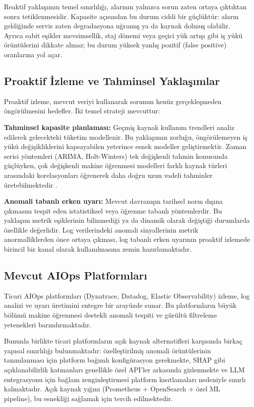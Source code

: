 Reaktif yaklaşımın temel sınırlılığı, alarmın yalnızca sorun zaten ortaya çıktıktan sonra tetiklenmesidir.
Kapasite açısından bu durum ciddi bir güçlüktür: alarm geldiğinde servis zaten degradasyona uğramış ya da kaynak dolmuş olabilir.
Ayrıca sabit eşikler mevsimsellik, staj dönemi veya geçici yük artışı gibi iş yükü örüntülerini dikkate almaz; bu durum yüksek yanlış pozitif (false positive) oranlarına yol açar.

\subsection{Proaktif İzleme ve Tahminsel Yaklaşımlar}

Proaktif izleme, mevcut veriyi kullanarak sorunun henüz gerçekleşmeden öngörülmesini hedefler.
İki temel strateji mevcuttur:

\textbf{Tahminsel kapasite planlaması:} Geçmiş kaynak kullanım trendleri analiz edilerek gelecekteki tüketim modellenir.
Bu yaklaşımın zorluğu, öngörülemeyen iş yükü değişikliklerini kapsayabilen yeterince esnek modeller geliştirmektir.
Zaman serisi yöntemleri (ARIMA, Holt-Winters) tek değişkenli tahmin konusunda güçlüyken, çok değişkenli makine öğrenmesi modelleri farklı kaynak türleri arasındaki korelasyonları öğrenerek daha doğru uzun vadeli tahminler üretebilmektedir \autocite{makedonas2022}.

\textbf{Anomali tabanlı erken uyarı:} Mevcut davranışın tarihsel norm dışına çıkmasını tespit eden istatistiksel veya öğrenme tabanlı yöntemlerdir.
Bu yaklaşım metrik eşiklerinin bilinmediği ya da dinamik olarak değiştiği durumlarda özellikle değerlidir.
Log verilerindeki anomali sinyallerinin metrik anormalliklerden önce ortaya çıkması, log tabanlı erken uyarının proaktif izlemede birincil bir kanal olarak kullanılmasına zemin hazırlamaktadır.

\subsection{Mevcut AIOps Platformları}

Ticari AIOps platformları (Dynatrace, Datadog, Elastic Observability) izleme, log analizi ve uyarı üretimini entegre bir arayüzde sunar.
Bu platformların büyük bölümü makine öğrenmesi destekli anomali tespiti ve gürültü filtreleme yetenekleri barındırmaktadır.

Bununla birlikte ticari platformların açık kaynak alternatifleri karşısında birkaç yapısal sınırlılığı bulunmaktadır: özelleştirilmiş anomali örüntülerinin tanımlanması için platform bağımlı konfigürasyon gerekmekte, SHAP gibi açıklanabilirlik katmanları genellikle özel API'ler arkasında gizlenmekte ve LLM entegrasyonu için bağlam zenginleştirmesi platform kısıtlamaları nedeniyle sınırlı kalmaktadır.
Açık kaynak yığını (Prometheus + OpenSearch + özel ML pipeline), bu esnekliği sağlamak için tercih edilmektedir.


